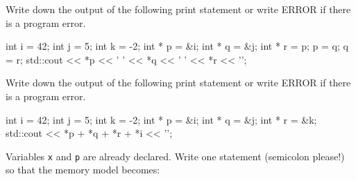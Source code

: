 

\nextq
Write down the output of the following print statement
or write ERROR if there is a program error.
\begin{console}
int i = 42;
int j = 5;
int k = -2;
int * p = &i;
int * q = &j;
int * r = p;
p = q;
q = r;
std::cout << *p << ' ' << *q << ' ' << *r << '\n';
\end{console}
\ANSWER
\begin{answercode}

\end{answercode}

\nextq
Write down the output of the following print statement
or write ERROR if there is a program error.
\begin{console}
int i = 42;
int j = 5;
int k = -2;
int * p = &i;
int * q = &j;
int * r = &k;
std::cout << *p + *q + *r + *i << '\n';
\end{console}
\ANSWER
\begin{answercode}

\end{answercode}

\nextq
Variables \verb!x! and \verb!p! are already declared.
Write one statement (semicolon please!) so that the memory model becomes:
\ANSWER
\begin{answercode}

\end{answercode}

